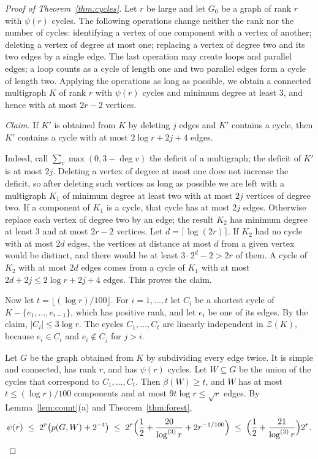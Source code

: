 \documentclass[11pt]{article}
\theoremstyle{definition}
\theoremstyle{remark}
\newcommand{\Z}{\mathcal{Z}}
\newcommand{\lgk}[1]{\log^{(#1)}}
\begin{document}
\begin{proof}[Proof of Theorem~\ref{thm:cycles}]
Let $r$ be large and let $G_0$ be a graph of rank $r$ with $\psi(r)$ cycles. The
following operations change neither the rank nor the number of cycles: identifying a vertex of one
component with a vertex of another; deleting a vertex of degree at most one; replacing a vertex of
degree two and its two edges by a single edge. The last operation may create loops and parallel
edges; a loop counts as a cycle of length one and two parallel edges form a cycle of length two.
Applying the operations as long as possible, we obtain a connected multigraph $K$ of rank $r$ with
$\psi(r)$ cycles and minimum degree at least $3$, and hence with at most $2r-2$ vertices.

\emph{Claim.} If $K'$ is obtained from $K$ by deleting $j$ edges and $K'$ contains a cycle, then
$K'$ contains a cycle with at most $2\log r+2j+4$ edges.

Indeed, call $\sum_v\max(0,3-\deg v)$ the deficit of a multigraph; the deficit of $K'$ is at most
$2j$. Deleting a vertex of degree at most one does not increase the deficit, so after deleting such
vertices as long as possible we are left with a multigraph $K_1$ of minimum degree at least two with
at most $2j$ vertices of degree two. If a component of $K_1$ is a cycle, that cycle has at most $2j$
edges. Otherwise replace each vertex of degree two by an edge; the result $K_2$ has minimum degree at
least $3$ and at most $2r-2$ vertices. Let $d=\lceil\log(2r)\rceil$. If $K_2$ had no cycle with at
most $2d$ edges, the vertices at distance at most $d$ from a given vertex would be distinct, and
there would be at least $3\cdot2^{d}-2>2r$ of them. A cycle of $K_2$ with at most $2d$ edges comes
from a cycle of $K_1$ with at most $2d+2j\le2\log r+2j+4$ edges. This proves the claim.

Now let $t=\lfloor(\log r)/100\rfloor$. For $i=1,\dots,t$ let $C_i$ be a shortest cycle of
$K-\{e_1,\dots,e_{i-1}\}$, which has positive rank, and let $e_i$ be one of its edges. By the claim, $|C_i|\le3\log r$. The
cycles $C_1,\dots,C_t$ are linearly independent in $\Z(K)$, because $e_i\in C_i$ and $e_i\notin C_j$
for $j>i$.

Let $G$ be the graph obtained from $K$ by subdividing every edge twice. It is simple and connected,
has rank $r$, and has $\psi(r)$ cycles. Let $W\subseteq G$ be the union of the cycles that correspond
to $C_1,\dots,C_t$. Then $\beta(W)\ge t$, and $W$ has at most $t\le(\log r)/100$ components and at
most $9t\log r\le\sqrt r$ edges. By Lemma~\ref{lem:count}(a) and Theorem~\ref{thm:forest},
\[
  \psi(r)\;\le\;2^{r}\bigl(p(G,W)+2^{-t}\bigr)\;\le\;2^{r}\Bigl(\frac12+\frac{20}{\lgk3r}+2r^{-1/100}\Bigr)
  \;\le\;\Bigl(\frac12+\frac{21}{\lgk3r}\Bigr)2^{r}.\qedhere
\]
\end{proof}
\end{document}
